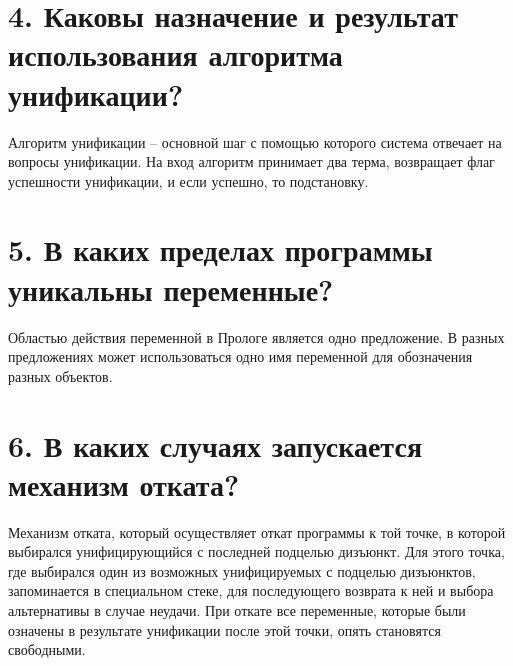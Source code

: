 \section*{4. Каковы назначение и результат использования алгоритма унификации?}
Алгоритм унификации – основной шаг с помощью которого система отвечает на вопросы унификации. 
На вход алгоритм принимает два терма, возвращает флаг успешности унификации, и если успешно, то подстановку.

\section*{5. В каких пределах программы уникальны переменные?}
Областью действия переменной в Прологе является одно предложение.
В разных предложениях может использоваться одно имя переменной для обозначения разных объектов.

\section*{6. В каких случаях запускается механизм отката?}
Механизм отката, который осуществляет откат программы к той точке, в которой выбирался унифицирующийся с последней подцелью дизъюнкт.
Для этого точка, где выбирался один из возможных унифицируемых с подцелью дизъюнктов, запоминается в специальном стеке, для последующего возврата к ней и выбора альтернативы в случае неудачи. 
При откате все переменные, которые были означены в результате унификации после этой точки, опять становятся свободными.